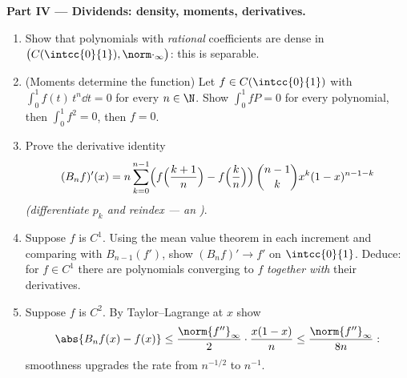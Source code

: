 \begin{problem}
\medskip
\noindent\textbf{Part IV --- Dividends: density, moments,
derivatives.}
\begin{enumerate}[resume]
  \item Show that polynomials with \emph{rational} coefficients
        are dense in $\bigl(C(\intcc{0}{1}),
        \norm\cdot_\infty\bigr)$: this  is
        separable.
  \item (Moments determine the function) Let $f \in
        C(\intcc{0}{1})$ with $\int_0^1 f(t)\,t^n \dd t = 0$
        for every $n \in \N$. Show $\int_0^1 f P = 0$ for every
        polynomial, then $\int_0^1 f^2 = 0$, then $f = 0$.
  \item Prove the derivative identity
        \[
        (B_nf)'(x) = n\sum_{k=0}^{n-1}\Bigl(
        f\Bigl(\frac{k+1}{n}\Bigr) -
        f\Bigl(\frac kn\Bigr)\Bigr)\,
        \binom{n-1}{k}x^k(1-x)^{n-1-k}
        \]
        \emph{(differentiate $p_k$ and reindex --- an )}.
  \item Suppose $f$ is $C^1$. Using the mean value theorem in
        each increment and comparing with $B_{n-1}(f')$, show
        $(B_nf)' \to f'$  on $\intcc{0}{1}$. Deduce:
        for $f \in C^1$ there are polynomials converging to $f$
        \emph{together with} their derivatives.
  \item Suppose $f$ is $C^2$. By Taylor--Lagrange at $x$ show
        \[
        \abs{B_nf(x) - f(x)} \leq
        \frac{\norm{f''}_\infty}{2}\cdot\frac{x(1-x)}{n}
        \leq \frac{\norm{f''}_\infty}{8n} :
        \]
        smoothness upgrades the rate from $n^{-1/2}$ to
        $n^{-1}$.
\end{enumerate}


\end{problem}
